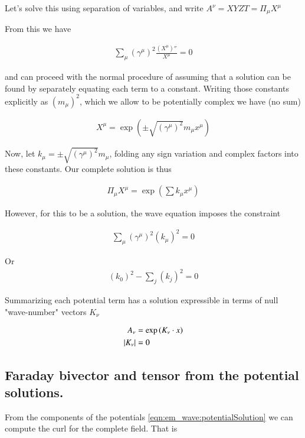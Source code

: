 Let's solve this using separation of variables, and write $A^\nu = X Y Z T = \Pi_{\mu} X^{\mu}$

From this we have

\begin{align*}
\sum_\mu (\gamma^\mu)^2 \frac{(X^\mu)''}{X^\mu} = 0
\end{align*}

and can proceed with the normal procedure of assuming that a solution can be
found by separately equating each term to a constant.  Writing those
constants explicitly as $(m_\mu)^2$, which we allow to be potentially complex
we have (no sum) 

\begin{align*}
X^\mu = \exp\left( \pm \sqrt{(\gamma^\mu)^2} m_\mu x^\mu \right)
\end{align*}

Now, let $k_\mu = \pm \sqrt{(\gamma^\mu)^2} m_\mu$, folding any sign variation
and complex factors into these constants.  Our complete solution
is thus

\begin{align*}
\Pi_\mu X^\mu = \exp\left( \sum k_\mu x^\mu \right)
\end{align*}

However, for this to be a solution, the wave equation imposes the constraint

\begin{align*}
\sum_\mu (\gamma^\mu)^2 (k_\mu)^2 = 0
\end{align*}

Or
\begin{align*}
(k_0)^2 - \sum_j (k_j)^2 = 0
\end{align*}

Summarizing each potential term has a solution expressible in terms of 
null "wave-number" vectors $K_\nu$

\begin{align}\label{eqn:em_wave:potentialSolution}
A_\nu &= \exp\left( K_\nu \cdot x \right)  \\
\left\lvert{K_\nu}\right\rvert &= 0
\end{align}

\subsection{Faraday bivector and tensor from the potential solutions. }

From the components of the potentials 
\ref{eqn:em_wave:potentialSolution}
we can compute the curl for the complete
field.  That is

